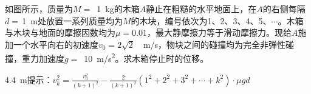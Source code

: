 如图所示，质量为\(M =\) \,\qty{1}{kg}的木箱\(A\)静止在粗糙的水平地面上，在\(A\)的右侧每隔\(d =\)\,\qty{1}{m}处放置一系列质量均为\(M\)的木块，编号依次为1、2、3、4、5、\(\cdots\)。木箱与木块与地面的摩擦因数均为\(\mu = 0.01\)，最大静摩擦力等于滑动摩擦力。现给\(A\)施加一个水平向右的初速度\(v_0 = 2 \sqrt{2}\) \,\qty{}{m/s}，物块之间的碰撞均为完全非弹性碰撞，重力加速度\(g =\) \,\qty{10}{m/s^2}。求木箱停止时的位移。

\begin{answer}
	\qty{4.4}{m}\quad 提示：\(v_k^2 = \frac{v_0^2}{(k + 1)^2} - \frac{2}{(k + 1)^2} (1^2 + 2^2 + 3^2 +\cdots + k^2)\cdot\mu gd\)
\end{answer}
